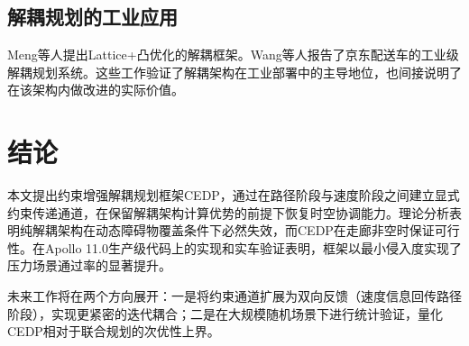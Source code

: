 \documentclass[a4paper,11pt]{article}
\begin{document}
\subsection{解耦规划的工业应用}

Meng等人提出Lattice+凸优化的解耦框架。Wang等人报告了京东配送车的工业级解耦规划系统。这些工作验证了解耦架构在工业部署中的主导地位，也间接说明了在该架构内做改进的实际价值。

\section{结论}

本文提出约束增强解耦规划框架CEDP，通过在路径阶段与速度阶段之间建立显式约束传递通道，在保留解耦架构计算优势的前提下恢复时空协调能力。理论分析表明纯解耦架构在动态障碍物覆盖条件下必然失效，而CEDP在走廊非空时保证可行性。在Apollo 11.0生产级代码上的实现和实车验证表明，框架以最小侵入度实现了压力场景通过率的显著提升。

未来工作将在两个方向展开：一是将约束通道扩展为双向反馈（速度信息回传路径阶段），实现更紧密的迭代耦合；二是在大规模随机场景下进行统计验证，量化CEDP相对于联合规划的次优性上界。
\end{document}
